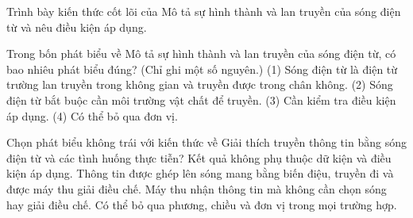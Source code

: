\begin{bt}
Trình bày kiến thức cốt lõi của Mô tả sự hình thành và lan truyền của sóng điện từ và nêu điều kiện áp dụng.
\end{bt}

\begin{ex}
Trong bốn phát biểu về Mô tả sự hình thành và lan truyền của sóng điện từ, có bao nhiêu phát biểu đúng? (Chỉ ghi một số nguyên.) (1) Sóng điện từ là điện từ trường lan truyền trong không gian và truyền được trong chân không. (2) Sóng điện từ bắt buộc cần môi trường vật chất để truyền. (3) Cần kiểm tra điều kiện áp dụng. (4) Có thể bỏ qua đơn vị.
\end{ex}

\begin{ex}
Chọn phát biểu không trái với kiến thức về Giải thích truyền thông tin bằng sóng điện từ và các tình huống thực tiễn?
\choice
{Kết quả không phụ thuộc dữ kiện và điều kiện áp dụng.}
{\True Thông tin được ghép lên sóng mang bằng biến điệu, truyền đi và được máy thu giải điều chế.}
{Máy thu nhận thông tin mà không cần chọn sóng hay giải điều chế.}
{Có thể bỏ qua phương, chiều và đơn vị trong mọi trường hợp.}
\end{ex}

